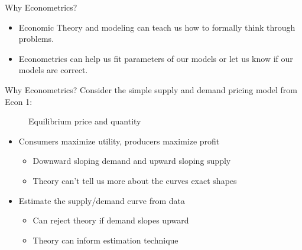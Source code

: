 \documentclass[notheorems,9pt]{beamer}
\begin{document}
\begin{frame}{Why Econometrics?} 
	\begin{itemize}
		\item Economic Theory and modeling can teach us how to formally think through problems.
		\item Econometrics can help us fit parameters of our models or let us know if our models are correct.
	\end{itemize}
\end{frame}
\begin{frame}{Why Econometrics?} 
	Consider the simple supply and demand pricing model from Econ 1:
	\begin{figure}[htpb]
		\centering
		\caption{Equilibrium price and quantity}%
	\end{figure}
	\begin{itemize}
		\item<1-3|only@1-3> Consumers maximize utility, producers maximize profit
		\begin{itemize}
			\item<2|only@2> Downward sloping demand and upward sloping supply
			\item<3|only@3> Theory can't tell us more about the curves exact shapes
		\end{itemize}
		\item<4-6|only@4-6> Estimate the supply/demand curve from data
		\begin{itemize}
			\item<5|only@5> Can reject theory if demand slopes upward
			\item<6|only@6> Theory can inform estimation technique
		\end{itemize}
	\end{itemize}
\end{frame}
\end{document}
